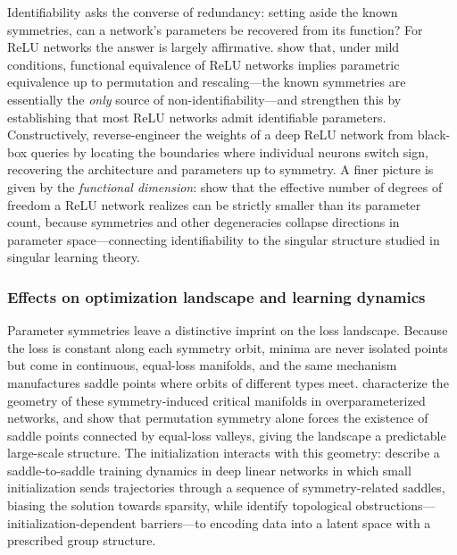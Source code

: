 \documentclass[mathematics,review,submit,moreauthors]{Definitions/mdpi}
\begin{document}
Identifiability asks the converse of redundancy: setting aside the known symmetries, can a network's parameters be recovered from its function?
For ReLU networks the answer is largely affirmative.
\citet{phuong2019} show that, under mild conditions, functional equivalence of ReLU networks implies parametric equivalence up to permutation and rescaling---the known symmetries are essentially the \emph{only} source of non-identifiability---and \citet{grillo2026} strengthen this by establishing that most ReLU networks admit identifiable parameters.
Constructively, \citet{rolnick2020p3icml} reverse-engineer the weights of a deep ReLU network from black-box queries by locating the boundaries where individual neurons switch sign, recovering the architecture and parameters up to symmetry.
A finer picture is given by the \emph{functional dimension}: \citet{elisendagrigsby2025aim} show that the effective number of degrees of freedom a ReLU network realizes can be strictly smaller than its parameter count, because symmetries and other degeneracies collapse directions in parameter space---connecting identifiability to the singular structure studied in singular learning theory.

\subsubsection{Effects on optimization landscape and learning dynamics}

Parameter symmetries leave a distinctive imprint on the loss landscape.
Because the loss is constant along each symmetry orbit, minima are never isolated points but come in continuous, equal-loss manifolds, and the same mechanism manufactures saddle points where orbits of different types meet.
\citet{simsek2021} characterize the geometry of these symmetry-induced critical manifolds in overparameterized networks, and \citet{brea2019} show that permutation symmetry alone forces the existence of saddle points connected by equal-loss valleys, giving the landscape a predictable large-scale structure.
The initialization interacts with this geometry: \citet{jacot2022} describe a saddle-to-saddle training dynamics in deep linear networks in which small initialization sends trajectories through a sequence of symmetry-related saddles, biasing the solution towards sparsity, while \citet{esmaeili2023} identify topological obstructions---initialization-dependent barriers---to encoding data into a latent space with a prescribed group structure.
\end{document}
